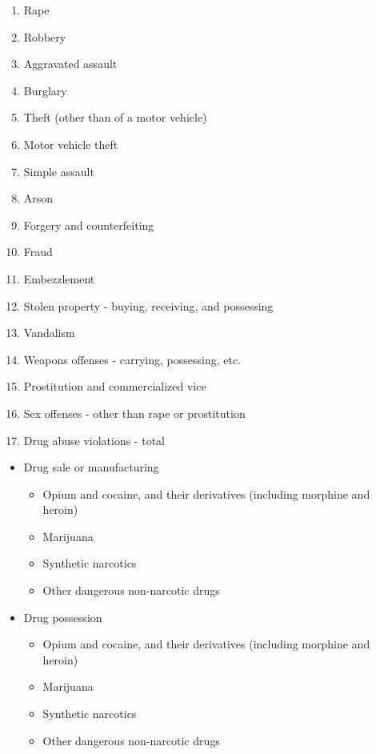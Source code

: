 \documentclass[
]{krantz}
\providecommand{\tightlist}{%
  \setlength{\itemsep}{0pt}\setlength{\parskip}{0pt}}
\begin{document}
\begin{enumerate}
\def\labelenumi{\arabic{enumi}.}
\setcounter{enumi}{1}
\tightlist
\item
  Rape
\item
  Robbery
\item
  Aggravated assault
\item
  Burglary
\item
  Theft (other than of a motor vehicle)
\item
  Motor vehicle theft
\item
  Simple assault
\item
  Arson
\item
  Forgery and counterfeiting
\item
  Fraud
\item
  Embezzlement
\item
  Stolen property - buying, receiving, and possessing
\item
  Vandalism
\item
  Weapons offenses - carrying, possessing, etc.
\item
  Prostitution and commercialized vice
\item
  Sex offenses - other than rape or prostitution
\item
  Drug abuse violations - total
\end{enumerate}

\begin{itemize}
\tightlist
\item
  Drug sale or manufacturing

  \begin{itemize}
  \tightlist
  \item
    Opium and cocaine, and their derivatives (including
    morphine and heroin)
  \item
    Marijuana
  \item
    Synthetic narcotics
  \item
    Other dangerous non-narcotic drugs
  \end{itemize}
\item
  Drug possession

  \begin{itemize}
  \tightlist
  \item
    Opium and cocaine, and their derivatives (including
    morphine and heroin)
  \item
    Marijuana
  \item
    Synthetic narcotics
  \item
    Other dangerous non-narcotic drugs
  \end{itemize}
\end{itemize}
\end{document}
